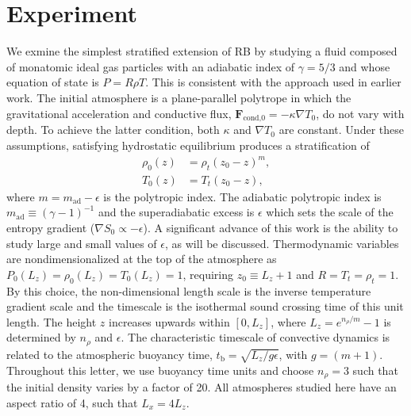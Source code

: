 \documentclass[aps, prl, twocolumn, nofootinbib, groupedaddress, amsfonts, amssymb, amsmath]{revtex4-1}
\newcommand{\grad}{\ensuremath{\nabla}}
\begin{document}
\section{Experiment} 
\label{sec:experiment}
We exmine the simplest stratified extension of RB by studying a
fluid composed of monatomic ideal gas particles with an adiabatic 
index of $\gamma = 5/3$ and whose equation of state is $P = R\rho T$. 
This is consistent with the approach used in earlier work.
The initial atmosphere is a plane-parallel polytrope in which 
the gravitational acceleration and conductive flux, 
$\bm{F}_{\text{cond,0}} = -\kappa \grad T_0$, do not vary with depth. To
achieve the latter condition, both $\kappa$ and $\grad T_0$ are constant.
Under these assumptions, satisfying hydrostatic 
equilibrium produces a stratification of
\begin{equation}
\begin{split}
\rho_0(z) &= \rho_{t}(z_0 - z)^m, \\
T_0(z)    &= T_{t}(z_0 - z),
\label{eqn:polytrope}
\end{split}
\end{equation}
where $m = m_{\text{ad}} - \epsilon$ is the polytropic index.
The adiabatic polytropic index is $m_{\text{ad}} \equiv (\gamma-1)^{-1}$ and
the superadiabatic excess is $\epsilon$ which sets the scale 
of the entropy gradient ($\grad S_0 \propto -\epsilon$).
A significant advance of this work is the ability to study large 
and small values of $\epsilon$, as will be discussed.
Thermodynamic variables are nondimensionalized at the 
top of the atmosphere as  $P_0(L_z) = \rho_0(L_z) = T_0(L_z) = 1$, 
requiring $z_0 \equiv L_z + 1$ and $R = T_{t} = \rho_{t} = 1$.
By this choice, the non-dimensional length scale is the inverse 
temperature gradient scale and the timescale is the isothermal 
sound crossing time of this unit length.
The height $z$ increases upwards within $[0, L_{z}]$, 
where $L_{z} = e^{n_{\rho}/m} - 1$ is
determined by $n_\rho$ and $\epsilon$.
The characteristic timescale of convective dynamics
is related to the atmospheric buoyancy time, 
$t_{\text{b}} = \sqrt{L_z/g\epsilon}$, with $g = (m+1)$.
Throughout this letter, we use buoyancy time units and 
choose $n_{\rho} = 3$ such that the 
initial density varies by a factor of 20.
All atmospheres studied here have an aspect ratio of 4, 
such that $L_x = 4L_z$.
\end{document}
